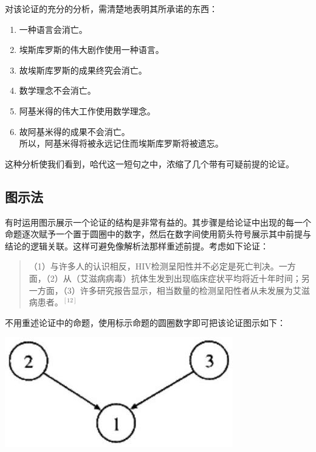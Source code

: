 对该论证的充分的分析，需清楚地表明其所承诺的东西：

\begin{enumerate}
  \item 一种语言会消亡。
  \item 埃斯库罗斯的伟大剧作使用一种语言。
  \item 故埃斯库罗斯的成果终究会消亡。
  \item 数学理念不会消亡。
  \item 阿基米得的伟大工作使用数学理念。
  \item 故阿基米得的成果不会消亡。\\
  所以，阿基米得将被永远记住而埃斯库罗斯将被遗忘。
\end{enumerate}

这种分析使我们看到，哈代这一短句之中，浓缩了几个带有可疑前提的论证。

\subsection{图示法}

有时运用图示展示一个论证的结构是非常有益的。其步骤是给论证中出现的每一个命题逐次赋予一个置于圆圈中的数字，然后在数字间使用箭头符号展示其中前提与结论的逻辑关联。这样可避免像解析法那样重述前提。考虑如下论证：

\begin{quotation}
（1）与许多人的认识相反，HIV检测呈阳性并不必定是死亡判决。一方面，（2）从（艾滋病病毒）抗体生发到出现临床症状平均将近十年时间；另一方面，（3）许多研究报告显示，相当数量的检测呈阳性者从未发展为艾滋病患者。${}^{[12]}$
\end{quotation}

不用重述论证中的命题，使用标示命题的圆圈数字即可把该论证图示如下：

\begin{center}
\includegraphics[width=\textwidth]{images/2025_05_15_6a28331d5e7c993ad07ag-030.jpg}
\end{center}

